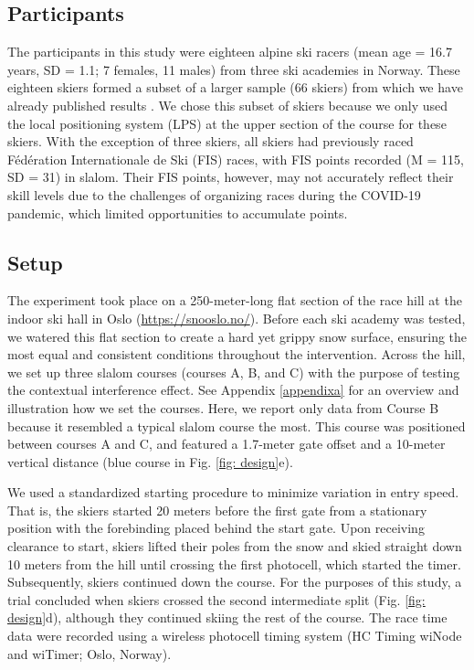 \documentclass{article}
\begin{document}
\subsection*{Participants}
The participants in this study were eighteen alpine ski racers (mean age = 16.7 years, SD = 1.1; 7 females, 11 males) from three ski academies in Norway. These eighteen skiers formed a subset of a larger sample (66 skiers) from which we have already published results \cite{magelssen_is_2022}. We chose this subset of skiers because we only used the local positioning system (LPS) at the upper section of the course for these skiers. With the exception of three skiers, all skiers had previously raced Fédération Internationale de Ski (FIS) races, with FIS points recorded (M = 115, SD = 31) in slalom. Their FIS points, however, may not accurately reflect their skill levels due to the challenges of organizing races during the COVID-19 pandemic, which limited opportunities to accumulate points.

\subsection{Setup}
The experiment took place on a 250-meter-long flat section of the race hill at the indoor ski hall in Oslo (\url{https://snooslo.no/}). Before each ski academy was tested, we watered this flat section to create a hard yet grippy snow surface, ensuring the most equal and consistent conditions throughout the intervention. Across the hill, we set up three slalom courses (courses A, B, and C) with the purpose of testing the contextual interference effect\cite{magelssen_is_2022}. See Appendix \ref{appendixa} for an overview and illustration how we set the courses. Here, we report only data from Course B because it resembled a typical slalom course the most. This course was positioned between courses A and C, and featured a 1.7-meter gate offset and a 10-meter vertical distance (blue course in Fig. \ref{fig: design}e). 

We used a standardized starting procedure to minimize variation in entry speed. That is, the skiers started 20 meters before the first gate from a stationary position with the forebinding placed behind the start gate. Upon receiving clearance to start, skiers lifted their poles from the snow and skied straight down 10 meters from the hill until crossing the first photocell, which started the timer. Subsequently, skiers continued down the course. For the purposes of this study, a trial concluded when skiers crossed the second intermediate split (Fig. \ref{fig: design}d), although they continued skiing the rest of the course. The race time data were recorded using a wireless photocell timing system (HC Timing wiNode and wiTimer; Oslo, Norway).
\end{document}
